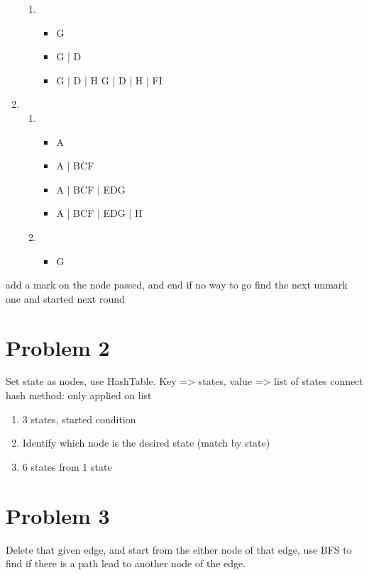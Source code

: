 \documentclass{article}
\begin{document}
\begin{enumerate}[1)]
\begin{enumerate}[1)]
            \item 
                \begin{itemize}
                    \item G 
                    \item G | D
                    \item G | D | H
                    \iten G | D | H | FI
                \end{itemize}
        \end{enumerate}
    \item
        \begin{enumerate}[1)]
            \item 
                \begin{itemize}
                    \item A 
                    \item A | BCF
                    \item A | BCF | EDG
                    \item A | BCF | EDG | H
                \end{itemize}
            \item 
                \begin{itemize}
                    \item G
                \end{itemize}
        \end{enumerate}
\end{enumerate}

add a mark on the node passed, and end if no way to go
find the next unmark one and started next round

\section{Problem 2}

Set state as nodes, use HashTable. Key => states, value => list of states connect
hash method: only applied on list

\begin{enumerate}
    \item 3 states, started condition
    \item Identify which node is the desired state (match by state)
    \item 6 states from 1 state
\end{enumerate}

\section{Problem 3}

Delete that given edge, and start from the either node of that edge, use BFS to find if there is a path lead to another node of the edge.
\end{document}
